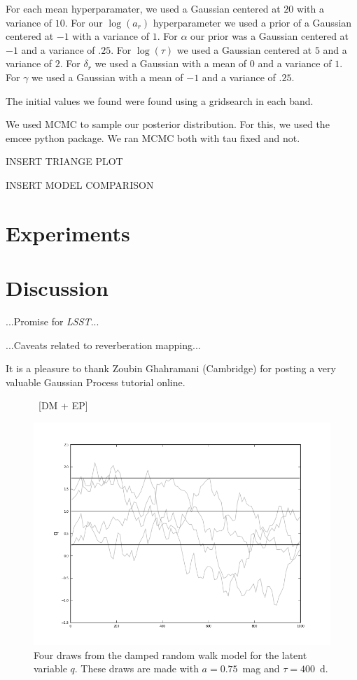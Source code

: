 \documentclass[letterpaper,12pt,preprint]{aastex}
\newcommand{\project}[1]{\textsl{#1}}
\newcommand{\lsst}{\project{LSST}}
\begin{document}
For each mean hyperparamater, we used a Gaussian centered at $20$ with a variance of $10$. For our $\log(a_r)$ hyperparameter we used a prior of a Gaussian centered at $-1$ with a variance of $1$. For $\alpha$ our prior was a Gaussian centered at $-1$ and a variance of $.25$. For $\log(\tau)$ we used a Gaussian centered at $5$ and a variance of $2$. For $\delta_r$ we used a Gaussian with a mean of $0$ and a variance of $1$. For $\gamma$ we used a Gaussian with a mean of $-1$ and a variance of $.25$. 

The initial values we found were found using a gridsearch in each band.


We used MCMC to sample our posterior distribution. For this, we used the emcee python package. We ran MCMC both with tau fixed and not. 

INSERT TRIANGE PLOT

INSERT MODEL COMPARISON


\section{Experiments}

\section{Discussion}

...Promise for \lsst...

...Caveats related to reverberation mapping...

It is a pleasure to thank Zoubin Ghahramani (Cambridge) for posting a
very valuable Gaussian Process tutorial online.

\clearpage
\begin{figure}
~[DM + EP]~
\caption{Four draws from the damped random walk model for the latent
  variable $q$.  These draws are made with $a=0.75$~mag and
  $\tau=400$~d.\label{fig:qdraws}}
\includegraphics [width=\textwidth]{latentvar.png}
\end{figure}
\end{document}
